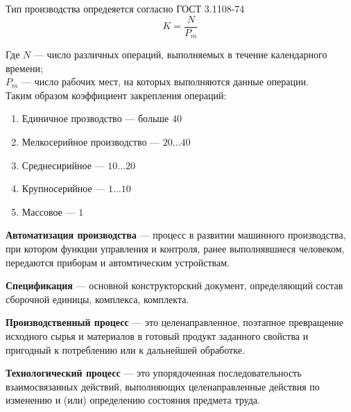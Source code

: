 Тип производства опредеяется согласно ГОСТ 3.1108-74
\[
  K = \frac{N}{P_m}
\] 

Где $N$ --- число различных операций, выполняемых в течение календарного
времени;\\
$P_m$  --- число рабочих мест, на которых выполняются данные операции.\\
Таким образом коэффициент закрепления операций:
\begin{enumerate}
  \item Единичное прозводство --- больше $40$
  \item Мелкосерийное производство --- $20\dots40$
  \item Среднесирийное --- $10\dots20$ 
  \item Крупносерийное --- $1\dots10$ 
  \item Массовое --- $1$
\end{enumerate}

\textbf{Автоматизация производства} --- процесс в развитии машинного
производства, при котором функции управления и контроля, ранее выполнявшиеся
человеком, передаются приборам и автомтическим устройствам.

\textbf{Спецификация} --- основной конструкторский документ, определяющий состав
сборочной единицы, комплекса, комплекта.

\begin{figure}[htpb]
  \centering
\end{figure}

\textbf{Производственный процесс} --- это целенаправленное, поэтапное
превращение исходного сырья и материалов в готовый продукт заданного свойства и
пригодный к потреблению или к дальнейшей обработке.

\textbf{Технологический процесс} --- это упорядоченная последовательность
взаимосвязанных действий, выполняющих целенаправленные действия по изменению и
(или) определению состояния предмета труда.

